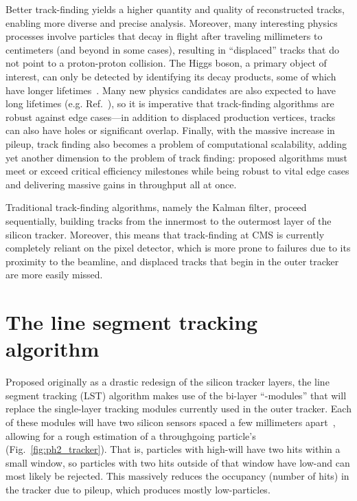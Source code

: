 Better track-finding yields a higher quantity and quality of reconstructed tracks, enabling more diverse and precise analysis.
Moreover, many interesting physics processes involve particles that decay in flight after traveling millimeters to centimeters (and beyond in some cases), resulting in ``displaced'' tracks that do not point to a proton-proton collision.
The Higgs boson, a primary object of interest, can only be detected by identifying its decay products, some of which have longer lifetimes~\cite{Bols:2020bkb}. 
Many new physics candidates are also expected to have long lifetimes (e.g. Ref.~\cite{CMS:2023bay}), so it is imperative that track-finding algorithms are robust against edge cases---in addition to displaced production vertices, tracks can also have holes or significant overlap.
Finally, with the massive increase in pileup, track finding also becomes a problem of computational scalability, adding yet another dimension to the problem of track finding: proposed algorithms must meet or exceed critical efficiency milestones while being robust to vital edge cases and delivering massive gains in throughput all at once.

Traditional track-finding algorithms, namely the Kalman filter, proceed sequentially, building tracks from the innermost to the outermost layer of the silicon tracker. 
Moreover, this means that track-finding at CMS is currently completely reliant on the pixel detector, which is more prone to failures due to its proximity to the beamline, and displaced tracks that begin in the outer tracker are more easily missed.

\section{The line segment tracking algorithm}
Proposed originally as a drastic redesign of the silicon tracker layers, the line segment tracking (LST) algorithm makes use of the bi-layer ``\pt-modules'' that will replace the single-layer tracking modules currently used in the outer tracker. 
Each of these modules will have two silicon sensors spaced a few millimeters apart~\cite{CERN-LHCC-2017-009}, allowing for a rough estimation of a throughgoing particle's \pt (Fig.~\ref{fig:ph2_tracker}). 
That is, particles with high-\pt will have two hits within a small window, so particles with two hits outside of that window have low-\pt and can most likely be rejected. 
This massively reduces the occupancy (number of hits) in the tracker due to pileup, which produces mostly low-\pt particles. 

